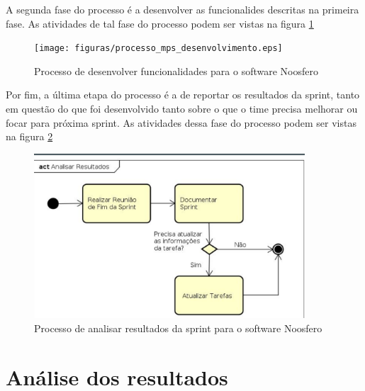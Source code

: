 \documentclass[a4paper, 11pt]{article}
\begin{document}
A segunda fase do processo é a desenvolver as funcionalides descritas na
primeira fase. As atividades de tal fase do processo podem ser vistas na figura
\ref{fig:processo_noosfero_desenvolvimento}

\begin{figure}[h]
  \centering
  \texttt{[image: figuras/processo\_mps\_desenvolvimento.eps]}
  \caption{Processo de desenvolver funcionalidades para o software Noosfero}
  \label{fig:processo_noosfero_desenvolvimento}
\end{figure}

Por fim, a última etapa do processo é a de reportar os resultados da sprint,
tanto em questão do que foi desenvolvido tanto sobre o que o time precisa
melhorar ou focar para próxima sprint. As atividades dessa fase do processo
podem ser vistas na figura \ref{fig:processo_noosfero_resultado}

\begin{figure}[h]
  \centering
  \includegraphics[width=0.9\textwidth]{figuras/processo_mps_resultados.eps}
  \caption{Processo de analisar resultados da sprint para o software Noosfero}
  \label{fig:processo_noosfero_resultado}
\end{figure}

\section*{Análise dos resultados}

\begin{table}[h]
\centering
{}
\caption{Relatório de Avaliação}
\label{tab:relatorio_de_avaliacao}
\end{table}
\end{document}
